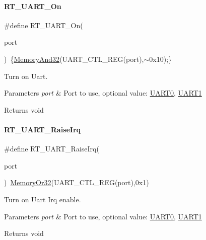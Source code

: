 \paragraph{\texorpdfstring{R\+T\+\_\+\+U\+A\+R\+T\+\_\+\+On}{RT\_UART\_On}}
{\footnotesize\ttfamily \#define R\+T\+\_\+\+U\+A\+R\+T\+\_\+\+On(\begin{DoxyParamCaption}\item[{}]{port }\end{DoxyParamCaption})~\{\mbox{\hyperlink{a00020_ad87cedffcaadc51db22594fce55173d4}{Memory\+And32}}(U\+A\+R\+T\+\_\+\+C\+T\+L\+\_\+\+R\+EG(port),$\sim$0x10);\}}



Turn on Uart. 


\begin{DoxyParams}{Parameters}
{\em port} & Port to use, optional value\+: \mbox{\hyperlink{a00056_a0508661f121639ffdee7de2353a0def2}{U\+A\+R\+T0}}, \mbox{\hyperlink{a00056_a8d69bf04d07af4fbbab5a8bd291f65ff}{U\+A\+R\+T1}} \\
\hline
\end{DoxyParams}
\begin{DoxyReturn}{Returns}
void 
\end{DoxyReturn}
\mbox{\label{a00056_ad8934a303c429b70176995f2dd6ac67b}} 
\paragraph{\texorpdfstring{R\+T\+\_\+\+U\+A\+R\+T\+\_\+\+Raise\+Irq}{RT\_UART\_RaiseIrq}}
{\footnotesize\ttfamily \#define R\+T\+\_\+\+U\+A\+R\+T\+\_\+\+Raise\+Irq(\begin{DoxyParamCaption}\item[{}]{port }\end{DoxyParamCaption})~\mbox{\hyperlink{a00020_a27874a97deab7cecdde5ddecf466e31e}{Memory\+Or32}}(U\+A\+R\+T\+\_\+\+C\+T\+L\+\_\+\+R\+EG(port),0x1)}



Turn on Uart Irq enable. 


\begin{DoxyParams}{Parameters}
{\em port} & Port to use, optional value\+: \mbox{\hyperlink{a00056_a0508661f121639ffdee7de2353a0def2}{U\+A\+R\+T0}}, \mbox{\hyperlink{a00056_a8d69bf04d07af4fbbab5a8bd291f65ff}{U\+A\+R\+T1}} \\
\hline
\end{DoxyParams}
\begin{DoxyReturn}{Returns}
void 
\end{DoxyReturn}
\mbox{\label{a00056_a7804645fb092b24545278660f6b66409}} 
